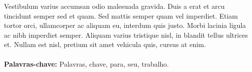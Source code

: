 Vestibulum varius accumsan odio malesuada gravida. Duis a erat et arcu tincidunt semper sed et quam. Sed mattis semper quam vel imperdiet. Etiam tortor orci, ullamcorper ac aliquam eu, interdum quis justo. Morbi lacinia ligula ac nibh imperdiet semper. Aliquam varius tristique nisl, in blandit tellus ultrices et. Nullam est nisl, pretium sit amet vehicula quis, cursus at enim.
\\
\\
\textbf{Palavras-chave:} Palavras, chave, para, seu, trabalho.
